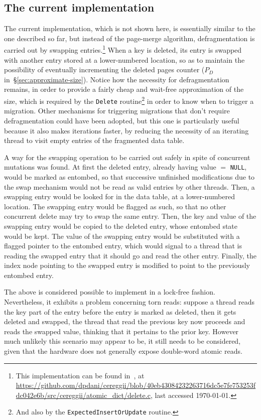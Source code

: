 \subsection{The current implementation}\label{subsec:the-current-implementation}

The current implementation, which is not shown here, is essentially similar to the one described so far, but instead of the page-merge algorithm, defragmentation is carried out by swapping entries.\footnote{%
	This implementation can be found in~\cite{cereggii}, at \url{https://github.com/dpdani/cereggii/blob/40eb43084232263716dc5e7fe753253fdc042e6b/src/cereggii/atomic_dict/delete.c}, last accessed \today.
}
When a key is deleted, its entry is swapped with another entry stored at a lower-numbered location, so as to maintain the possibility of eventually incrementing the deleted pages counter ($P_D$ in~\S\ref{sec:approximate-size}).
Notice how the necessity for defragmentation remains, in order to provide a fairly cheap and wait-free approximation of the size, which is required by the \texttt{Delete} routine\footnote{%
	And also by the \texttt{ExpectedInsertOrUpdate} routine.
} in order to know when to trigger a migration.
Other mechanisms for triggering migrations that don't require defragmentation could have been adopted, but this one is particularly useful because it also makes iterations faster, by reducing the necessity of an iterating thread to visit empty entries of the fragmented data table.

A way for the swapping operation to be carried out safely in spite of concurrent mutations was found.
At first the deleted entry, already having value $=$ \texttt{NULL}, would be marked as entombed, so that successive unfinished modifications due to the swap mechanism would not be read as valid entries by other threads.
Then, a swapping entry would be looked for in the data table, at a lower-numbered location.
The swapping entry would be flagged as such, so that no other concurrent delete may try to swap the same entry.
Then, the key and value of the swapping entry would be copied to the deleted entry, whose entombed state would be kept.
The value of the swapping entry would be substituted with a flagged pointer to the entombed entry, which would signal to a thread that is reading the swapped entry that it should go and read the other entry.
Finally, the index node pointing to the swapped entry is modified to point to the previously entombed entry.

The above is considered possible to implement in a lock-free fashion.
Nevertheless, it exhibits a problem concerning torn reads: suppose a thread reads the key part of the entry before the entry is marked as deleted, then it gets deleted and swapped, the thread that read the previous key now proceeds and reads the swapped value, thinking that it pertains to the prior key.
However much unlikely this scenario may appear to be, it still needs to be considered, given that the hardware does not generally expose double-word atomic reads.

